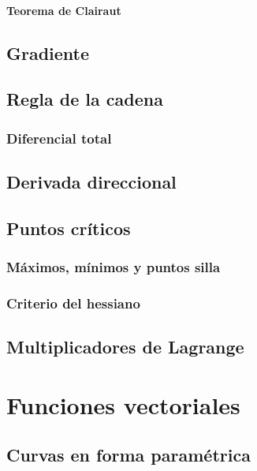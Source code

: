 \documentclass[12pt, fleqn]{report}                             %
\theoremstyle{break}                                            %
\begin{document}
                \subsubsection{Teorema de Clairaut}
                
        \section{Gradiente}
                
        \section{Regla de la cadena}
        
            \subsection{Diferencial total}
            
        \section{Derivada direccional}
        
        \section{Puntos críticos}
        
            \subsection{Máximos, mínimos y puntos silla}
            
            \subsection{Criterio del hessiano}
            
        \section{Multiplicadores de Lagrange}


    \chapter{Funciones vectoriales}
    
        \section{Curvas en forma paramétrica}
        
\end{document}
